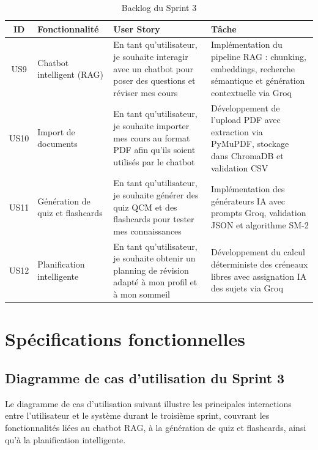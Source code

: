 \begin{table}[H]
\centering
\renewcommand{\arraystretch}{1.3}
\begin{tabular}{|c|p{3cm}|p{6cm}|p{4cm}|}
\hline
\textbf{ID} & \textbf{Fonctionnalité} & \textbf{User Story} & \textbf{Tâche} \\
\hline

US9 & Chatbot intelligent (RAG)
& En tant qu'utilisateur, je souhaite interagir avec un chatbot pour poser des questions et réviser mes cours
& Implémentation du pipeline RAG : chunking, embeddings, recherche sémantique et génération contextuelle via Groq \\ \hline

US10 & Import de documents
& En tant qu'utilisateur, je souhaite importer mes cours au format PDF afin qu'ils soient utilisés par le chatbot
& Développement de l'upload PDF avec extraction via PyMuPDF, stockage dans ChromaDB et validation CSV \\ \hline

US11 & Génération de quiz et flashcards
& En tant qu'utilisateur, je souhaite générer des quiz QCM et des flashcards pour tester mes connaissances
& Implémentation des générateurs IA avec prompts Groq, validation JSON et algorithme SM-2 \\ \hline

US12 & Planification intelligente
& En tant qu'utilisateur, je souhaite obtenir un planning de révision adapté à mon profil et à mon sommeil
& Développement du calcul déterministe des créneaux libres avec assignation IA des sujets via Groq \\ \hline

\end{tabular}
\caption{Backlog du Sprint 3}
\label{tab:backlogs3}
\end{table}

\section{Spécifications fonctionnelles}

\subsection{Diagramme de cas d'utilisation du Sprint 3}

Le diagramme de cas d'utilisation suivant illustre les principales interactions entre l'utilisateur et le système durant le troisième sprint, couvrant les fonctionnalités liées au chatbot RAG, à la génération de quiz et flashcards, ainsi qu'à la planification intelligente.


